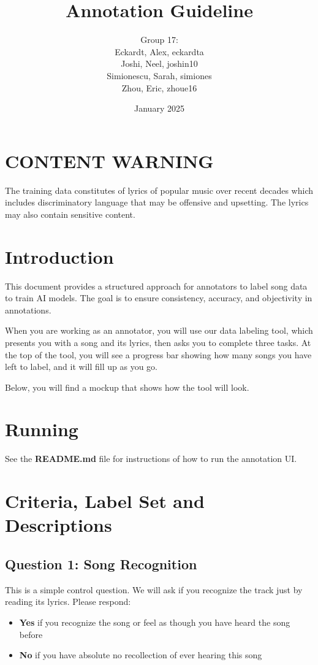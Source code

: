 \documentclass{article}
\title{Annotation Guideline}
\author{Group 17:\\ Eckardt, Alex, eckardta\\
Joshi, Neel, joshin10\\
Simionescu, Sarah, simiones\\
Zhou, Eric, zhoue16}
\date{January 2025}
\begin{document}
\maketitle

\section{CONTENT WARNING}
The training data constitutes of lyrics of popular music over recent decades which includes discriminatory language that may be offensive and upsetting. The lyrics may also contain sensitive content.



\section{Introduction}
This document provides a structured approach for annotators to label song data to train AI models. The goal is to ensure consistency, accuracy, and objectivity in annotations.

When you are working as an annotator, you will use our data labeling tool, which presents you with a song and its lyrics, then asks you to complete three tasks. At the top of the tool, you will see a progress bar showing how many songs you have left to label, and it will fill up as you go.

Below, you will find a mockup that shows how the tool will look.

\section{Running}
See the \textbf{README.md} file for instructions of how to run the annotation UI.



\section{Criteria, Label Set and Descriptions}
\subsection{Question 1: Song Recognition}
This is a simple control question. We will ask if you recognize the track just by reading its lyrics. Please respond:

\begin{itemize}
    \item \textbf{Yes} if you recognize the song or feel as though you have heard the song before
    \item \textbf{No} if you have absolute no recollection of ever hearing this song
\end{itemize}
\end{document}
